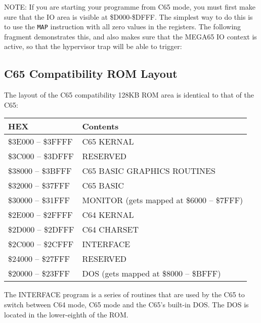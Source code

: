 NOTE: If you are starting your programme from C65 mode, you must first make
sure that the IO area is visible at \$D000-\$DFFF.  The simplest way to do
this is to use the {\tt MAP} instruction with all zero values in the registers.
The following fragment demonstrates this, and also makes sure that the MEGA65 IO
context is active, so that the hypervisor trap will be able to trigger:



\subsection{C65 Compatibility ROM Layout}

The layout of the C65 compatibility 128KB ROM area is identical to that of the C65:

{\ttfamily
\setlength{\tabcolsep}{3pt}
\begin{tabular}{|l|l|}
\hline
{\bf{HEX}} & {\bf{Contents}} \\
\hline
\$3E000 -- \$3FFFF & C65 KERNAL \\
\hline
\$3C000 -- \$3DFFF & RESERVED \\
\hline
\$38000 -- \$3BFFF & C65 BASIC GRAPHICS ROUTINES \\
\hline
\$32000 -- \$37FFF & C65 BASIC \\
\hline
\$30000 -- \$31FFF & MONITOR (gets mapped at \$6000 -- \$7FFF) \\
\hline
\$2E000 -- \$2FFFF & C64 KERNAL \\
\hline
\$2D000 -- \$2DFFF & C64 CHARSET \\
\hline
\$2C000 -- \$2CFFF & INTERFACE \\
\hline
\$24000 -- \$27FFF & RESERVED \\
\hline
\$20000 -- \$23FFF & DOS (gets mapped at \$8000 -- \$BFFF) \\
\hline
\end{tabular}
}

The INTERFACE program is a series of routines that are used by the C65
to switch between C64 mode, C65 mode and the C65's built-in DOS.  The
DOS is located in the lower-eighth of the ROM.




